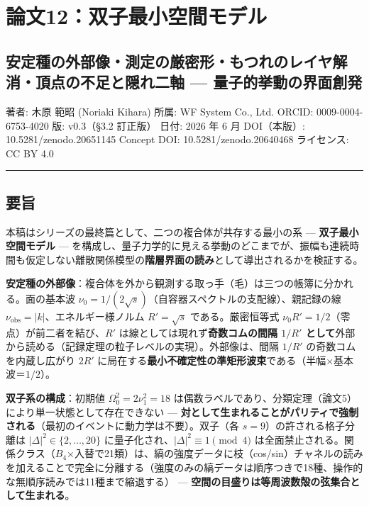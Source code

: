 \documentclass[
]{ltjsarticle}
\author{}
\date{}
\begin{document}
\section{論文12：双子最小空間モデル}\label{ux8ad6ux658712ux53ccux5b50ux6700ux5c0fux7a7aux9593ux30e2ux30c7ux30eb}

\subsection{安定種の外部像・測定の厳密形・もつれのレイヤ解消・頂点の不足と隠れ二軸
---
量子的挙動の界面創発}\label{ux5b89ux5b9aux7a2eux306eux5916ux90e8ux50cfux6e2cux5b9aux306eux53b3ux5bc6ux5f62ux3082ux3064ux308cux306eux30ecux30a4ux30e4ux89e3ux6d88ux9802ux70b9ux306eux4e0dux8db3ux3068ux96a0ux308cux4e8cux8ef8-ux91cfux5b50ux7684ux6319ux52d5ux306eux754cux9762ux5275ux767a}

著者: 木原 範昭 (Noriaki Kihara) 所属: WF System Co., Ltd. ORCID:
0009-0004-6753-4020 版: v0.3（§3.2 訂正版） 日付: 2026 年 6 月 DOI（本版）: 10.5281/zenodo.20651145
Concept DOI: 10.5281/zenodo.20640468 ライセンス: CC BY 4.0

\begin{center}\rule{0.5\linewidth}{0.5pt}\end{center}

\subsection{要旨}\label{ux8981ux65e8}

本稿はシリーズの最終篇として、二つの複合体が共存する最小の系 ---
\textbf{双子最小空間モデル} ---
を構成し、量子力学的に見える挙動のどこまでが、振幅も連続時間も仮定しない離散関係模型の\textbf{階層界面の読み}として導出されるかを検証する。

\textbf{安定種の外部像}：複合体を外から観測する取っ手（毛）は三つの帳簿に分かれる。面の基本波
\(\nu_0=1/(2\sqrt s)\)（自容器スペクトルの支配線）、親記録の線
\(\nu_{\mathrm{obs}}=|k|\)、エネルギー様ノルム \(R'=\sqrt s\)
である。厳密恒等式 \(\nu_0 R'=1/2\)（零点）が前二者を結び、\(R'\)
は線としては現れず\textbf{奇数コムの間隔 \(1/R'\)
として}外部から読める（記録定理の粒子レベルの実現）。外部像は、間隔
\(1/R'\) の奇数コムを内蔵し広がり \(2R'\)
に局在する\textbf{最小不確定性の準矩形波束}である（半幅×基本波＝\(1/2\)）。

\textbf{双子系の構成}：初期値 \(\Omega_0^2=2\nu_1^2=18\)
は偶数ラベルであり、分類定理（論文5）により単一状態として存在できない
---
\textbf{対として生まれることがパリティで強制される}（最初のイベントに動力学は不要）。双子（各
\(s=9\)）の許される格子分離は \(|\Delta|^2\in\{2,\ldots,20\}\)
に量子化され、\(|\Delta|^2\equiv1\pmod4\)
は全面禁止される。関係クラス（\(B_4\)×入替で21類）は、縞の強度データに枝（cos/sin）チャネルの読みを加えることで完全に分離する（強度のみの縞データは順序つきで18種、操作的な無順序読みでは11種まで縮退する） ---
\textbf{空間の目盛りは等周波数殻の弦集合として生まれる}。
\end{document}

